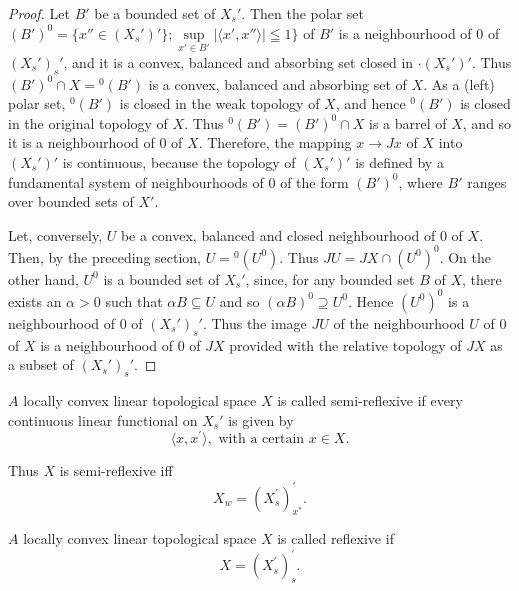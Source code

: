 \begin{proof}
 Let $B'$ be a bounded set of $X_s'$. Then the polar set $(B')^0 = \{x'' \in (X_s')'\}; \sup\limits_{x' \in B'} |\langle x', x'' \rangle| \leqq 1\}$ of $B'$ is a neighbourhood of $0$ of $(X_s')_s'$, and it is a convex, balanced and absorbing set closed in $\cdot(X_s')'$. Thus $(B')^0 \cap X = {}^0(B')$ is a convex, balanced and absorbing set of $X$. As a (left) polar set, ${}^0(B')$ is closed in the weak topology of $X$, and hence ${}^0(B')$ is closed in the original topology of $X$. Thus ${}^0(B') = (B')^0 \cap X$ is a barrel of $X$, and so it is a neighbourhood of $0$ of $X$. Therefore, the mapping $x \to Jx$ of $X$ into $(X_s')'$ is continuous, because the topology of $(X_s')'$ is defined by a fundamental system of neighbourhoods of $0$ of the form $(B')^0$, where $B'$ ranges over bounded sets of $X'$. 

Let, conversely, $U$ be a convex, balanced and closed neighbourhood of $0$ of $X$. Then, by the preceding section, $U = {}^0 (U^0)$. Thus $JU = JX \cap (U^0)^0$. On the other hand, $U^0$ is a bounded set of $X_s'$, since, for any bounded set $B$ of $X$, there exists an $\alpha > 0$ such that $\alpha B \subseteq U$ and so $(\alpha B)^0 \supseteq U^0$. Hence $(U^0)^0$ is a neighbourhood of $0$ of $(X_s')_s'$. Thus the image $JU$ of the neighbourhood $U$ of $0$ of $X$ is a neighbourhood of $0$ of $JX$ provided with the relative topology of $JX$ as a subset of $(X_s')_s'$. 
\end{proof}


\label{sec:AV.3}

\begin{definition}\label{def:AV.3.Definition.1} $A$ locally convex linear topological space $X$ is called semi-reflexive if every continuous linear functional on $X_s'$ is given by 
\begin{equation}\label{eq:AV.3.1}
\langle x, x ^{\prime} \rangle , \text{ with a certain } x \in X.
\end{equation}
\end{definition}

Thus $X$ is semi-reflexive iff 
\begin{equation}\label{eq:AV.3.2}
X _{w} = (X _{s} ^{\prime}) _ {x ^{*}} ^{\prime}.
\end{equation}

\begin{definition}\label{def:AV.3.Definition.2} $A$ locally convex linear topological space $X$ is called reflexive if 
\begin{equation}\label{eq:AV.3.3}
X = (X _{s} ^{\prime}) _{s} ^{\prime}.
\end{equation}
\end{definition}

